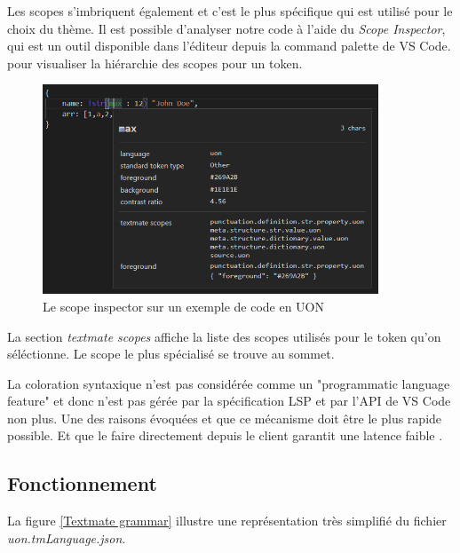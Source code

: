 \documentclass[
    iict, %
    il, %
]{heig-tb}
\begin{document}
Les scopes s'imbriquent également et c'est le plus spécifique qui est utilisé pour le choix du thème.
Il est possible d'analyser notre code à l'aide du \emph{Scope Inspector}, qui est un outil disponible dans l'éditeur depuis la command palette de VS Code.
pour visualiser la hiérarchie des scopes pour un token.

\begin{figure}[!h]
    \begin{center}
        \includegraphics[width=10cm]{assets/figures/scope-inspector.png}
    \end{center}
    \caption[Scope inspector]{\label{basic-uon} Le scope inspector sur un exemple de code en UON}
\end{figure}

La section \emph{textmate scopes} affiche la liste des scopes utilisés pour le token qu'on séléctionne. Le scope le plus spécialisé se trouve au sommet.

La coloration syntaxique n'est pas considérée comme un "programmatic language feature" et donc n'est pas gérée par la spécification LSP et par l'API de VS Code non plus.
Une des raisons évoquées et que ce mécanisme doit être le plus rapide possible. Et que le faire directement depuis le client garantit une latence faible
\cite{syntax-highlighting-editor}.

\subsection{Fonctionnement}

La figure \ref{Textmate grammar} illustre une représentation très simplifié du fichier \emph{uon.tmLanguage.json}.
\end{document}
